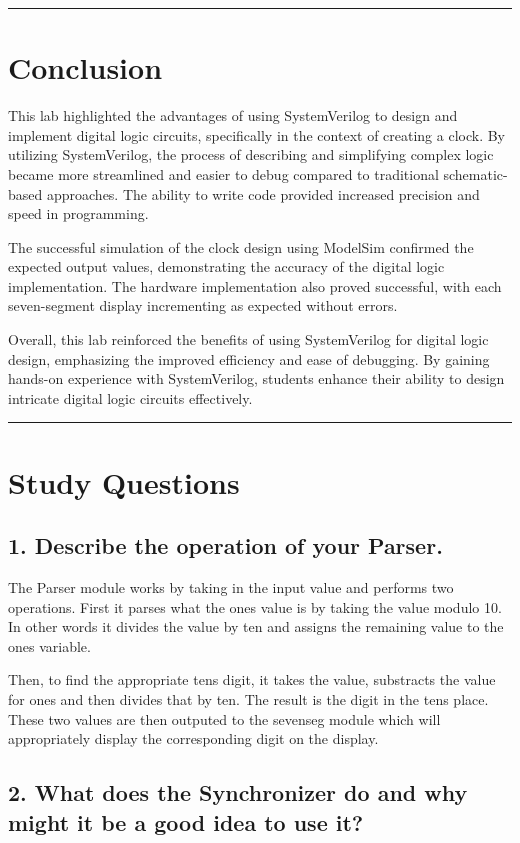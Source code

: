 \documentclass{article}
\begin{document}
\vspace{5mm}
\hrule

\section*{\textcolor{mycolor}{Conclusion}}
This lab highlighted the advantages of using SystemVerilog to design and implement digital logic circuits, specifically in the context of creating a clock. By utilizing SystemVerilog, the process of describing and simplifying complex logic became more streamlined and easier to debug compared to traditional schematic-based approaches. The ability to write code provided increased precision and speed in programming.

The successful simulation of the clock design using ModelSim confirmed the expected output values, demonstrating the accuracy of the digital logic implementation. The hardware implementation also proved successful, with each seven-segment display incrementing as expected without errors.

Overall, this lab reinforced the benefits of using SystemVerilog for digital logic design, emphasizing the improved efficiency and ease of debugging. By gaining hands-on experience with SystemVerilog, students enhance their ability to design intricate digital logic circuits effectively.

\vspace{5mm}
\hrule

\section*{\textcolor{mycolor}{Study Questions}}
\subsection*{\textcolor{mycolor}{1. Describe the operation of your Parser.}}
The Parser module works by taking in the input value and performs two operations. First it parses what the ones value is by taking the value modulo 10. In other words it divides the value by ten and assigns the remaining value to the ones variable. 

Then, to find the appropriate tens digit, it takes the value, substracts the value for ones and then divides that by ten. The result is the digit in the tens place. These two values are then outputed to the sevenseg module which will appropriately display the corresponding digit on the display.

\subsection*{\textcolor{mycolor}{2. What does the Synchronizer do and why might it be a good idea to use it?}}
\end{document}
